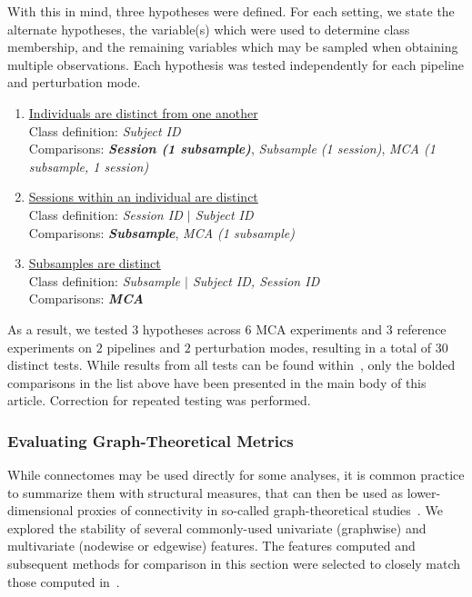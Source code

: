 \documentclass[fleqn,10pt]{SelfArx} %
\newcommand{\new}[1]{{\color{blue} #1}}
\begin{document}
With this in mind, three hypotheses were defined. For each setting, we state the alternate hypotheses, the variable(s)
which were used to determine class membership, and the remaining variables which may be sampled when obtaining multiple
observations. Each hypothesis was tested independently for each pipeline and perturbation mode.

\begin{enumerate}[label=$H_{A\arabic*}$:]
\item \underline{Individuals are distinct from one another}\\
Class definition: \textit{Subject ID}\\
Comparisons: \textbf{\textit{Session (1 subsample)}}, \textit{Subsample (1 session)},
\textit{MCA (1 subsample, 1 session)}
\item \underline{Sessions within an individual are distinct}\\
Class definition: \textit{Session ID $\vert$ Subject ID}\\
Comparisons: \textbf{\textit{Subsample}}, \textit{MCA (1 subsample)}
\item \underline{Subsamples are distinct}\\
Class definition: \textit{Subsample $\vert$ Subject ID, Session ID}\\
Comparisons: \textbf{\textit{MCA}}
\end{enumerate}

As a result, we tested $3$ hypotheses across $6$ MCA experiments and $3$ reference experiments on $2$ pipelines and $2$
perturbation modes, resulting in a total of $30$ distinct tests. \new{While results from all tests can be found
within~\sref{supsec:discrimfull}, only the bolded comparisons in the list above have been presented in the main body of
this article. Correction for repeated testing was performed.}

\subsubsection*{Evaluating Graph-Theoretical Metrics}
While connectomes may be used directly for some analyses, it is common practice to summarize them with structural
measures, that can then be used as lower-dimensional proxies of connectivity in so-called graph-theoretical
studies~\cite{Rubinov2010-fh}. We explored the stability of several commonly-used univariate (graphwise) and
multivariate (nodewise or edgewise) features. The features computed and subsequent methods for comparison in this
section were selected to closely match those computed in~\cite{Betzel2018-eo}.
\end{document}

